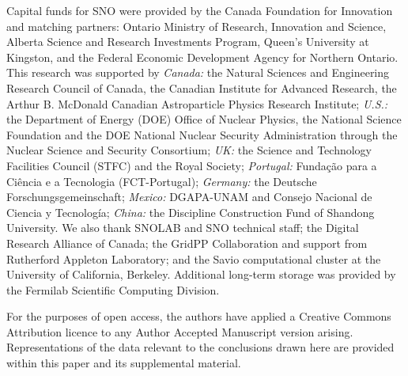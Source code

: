 \documentclass[%
 reprint,
superscriptaddress,
 amsmath,amssymb,
 aps,
]{revtex4-2}
\begin{document}
\begin{acknowledgments}
Capital funds for SNO\raisebox{0.5ex}{\tiny\textbf{+}} were provided by the Canada Foundation for Innovation and matching partners: 
Ontario Ministry of Research, Innovation and Science, 
Alberta Science and Research Investments Program, 
Queen’s University at Kingston, and 
the Federal Economic Development Agency for Northern Ontario. 
This research was supported by 
{\it Canada: }
the Natural Sciences and Engineering Research Council of Canada, 
the Canadian Institute for Advanced Research, 
the Arthur B. McDonald Canadian Astroparticle Physics Research Institute; 
{\it U.S.: }
the Department of Energy (DOE) Office of Nuclear Physics, 
the National Science Foundation and the DOE National Nuclear Security
Administration through the Nuclear Science and Security Consortium; 
{\it UK: }
the Science and Technology Facilities Council (STFC) and the Royal Society; 
{\it Portugal: } 
Funda\c{c}\~{a}o para a Ci\^{e}ncia e a Tecnologia (FCT-Portugal); 
{\it Germany: }
the Deutsche Forschungsgemeinschaft; 
{\it Mexico: }
DGAPA-UNAM and Consejo Nacional de Ciencia y Tecnolog\'{i}a; 
{\it China: }
the Discipline Construction Fund of Shandong University.  
We also thank SNOLAB and SNO\raisebox{0.5ex}{\tiny\textbf{+}} technical
staff; the Digital Research Alliance of Canada; the
GridPP Collaboration and support from Rutherford
Appleton Laboratory; and the Savio computational cluster
at the University of California, Berkeley. Additional long-term
storage was provided by the Fermilab Scientific Computing
Division.

For the purposes of open access, the authors have applied a Creative Commons Attribution licence to any Author Accepted Manuscript version arising. Representations of the data relevant to the conclusions drawn here are provided within this paper and its supplemental material.
\end{acknowledgments}



%
\end{document}
